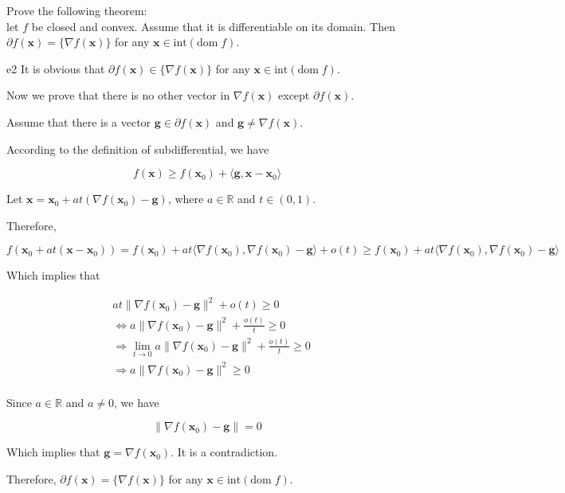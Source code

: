 \documentclass{article}
\newcommand{\xB}{\bm{x}}
\newcommand{\RBB}{\mathbb{R}}
\newcommand{\domf}{\textrm{dom}\;f}
\begin{document}
\begin{excercise}\label{e2}
Prove the following theorem: \\
let $f$ be closed and convex. Assume that it is differentiable on its domain. Then 
$\partial f(\xB) = \{ \nabla  f(\xB) \}$
for any $\xB \in \textrm{int}(\domf)$.
\end{excercise}

\begin{PROOF}{e2}
	It is obvious that $\partial f(\xB) \in \{ \nabla  f(\xB) \}$ for any $\xB \in \textrm{int}(\domf)$.

	Now we prove that there is no other vector in $\nabla f(\xB)$ except $\partial f(\xB)$.

	Assume that there is a vector $\bm{g} \in \partial f(\xB)$ and $\bm{g} \neq \nabla f(\xB)$.

	According to the definition of subdifferential, we have

	\[
	f(\bm{x}) \geq f(\xB_0) + \langle \bm{g}, \bm{x} - \xB_0 \rangle
	\]

	Let $\bm{x} = \xB_0 + at (\nabla f(\xB_0) - \bm{g})$, where $a \in \RBB$ and $t \in (0, 1)$.

	Therefore,

	\[
	f(\xB_0 + at(\xB - \xB_0)) = f(\xB_0) + at \langle \nabla f(\xB_0),  \nabla f(\xB_0) - \bm{g} \rangle + o(t) \geq f(\xB_0) + at \langle \nabla f(\xB_0),  \nabla f(\xB_0) - \bm{g} \rangle
	\]

	Which implies that

	\[
	\begin{aligned}
	&at \| \nabla f(\xB_0) - \bm{g} \|^2  + o(t) \geq 0 \\
	& \Leftrightarrow a \| \nabla f(\xB_0) - \bm{g} \|^2  + \frac{o(t)}{t} \geq 0 \\
	& \Rightarrow \lim_{t \to 0} a \| \nabla f(\xB_0) - \bm{g} \|^2  + \frac{o(t)}{t} \geq 0 \\
	& \Rightarrow a \| \nabla f(\xB_0) - \bm{g} \|^2  \geq 0 \\
	\end{aligned}
	\]

	Since $a \in \RBB$ and $a \neq 0$, we have

	\[
	\| \nabla f(\xB_0) - \bm{g} \|  = 0
	\]

	Which implies that $\bm{g} = \nabla f(\xB_0)$. 
	It is a contradiction.

	Therefore, $\partial f(\xB) = \{ \nabla f(\xB) \}$ for any $\xB \in \textrm{int}(\domf)$.
\end{PROOF}
\end{document}
